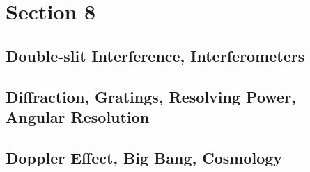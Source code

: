 \documentclass[../introphysics.tex]{subfiles}
\begin{document}
\chapter{Section 8}
\section{Double-slit Interference, Interferometers}
\section{Diffraction, Gratings, Resolving Power, Angular Resolution}
\section{Doppler Effect, Big Bang, Cosmology}
\end{document}
